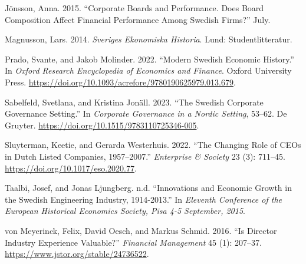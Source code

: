 \documentclass[
]{article}
\newlength{\cslhangindent}
\newenvironment{CSLReferences}[2] %
 {\begin{list}{}{%
  \setlength{\itemindent}{0pt}
  \setlength{\leftmargin}{0pt}
  \setlength{\parsep}{0pt}
  \ifodd #1
   \setlength{\leftmargin}{\cslhangindent}
   \setlength{\itemindent}{-1\cslhangindent}
  \fi
  \setlength{\itemsep}{#2\baselineskip}}}
 {\end{list}}
\begin{document}
\begin{CSLReferences}{1}{0}
Jönsson, Anna. 2015. {``Corporate {Boards} and {Performance}. {Does}
Board Composition Affect Financial Performance Among {Swedish} Firms?''}
July.

Magnusson, Lars. 2014. \emph{Sveriges Ekonomiska Historia}. Lund:
Studentlitteratur.

Prado, Svante, and Jakob Molinder. 2022. {``Modern {Swedish Economic
History}.''} In \emph{Oxford {Research Encyclopedia} of {Economics} and
{Finance}}. Oxford University Press.
\url{https://doi.org/10.1093/acrefore/9780190625979.013.679}.

Sabelfeld, Svetlana, and Kristina Jonäll. 2023. {``The {Swedish}
Corporate Governance Setting.''} In \emph{Corporate {Governance} in a
{Nordic Setting}}, 53--62. De Gruyter.
\url{https://doi.org/10.1515/9783110725346-005}.

Sluyterman, Keetie, and Gerarda Westerhuis. 2022. {``The {Changing Role}
of {CEOs} in {Dutch Listed Companies}, 1957--2007.''} \emph{Enterprise
\& Society} 23 (3): 711--45. \url{https://doi.org/10.1017/eso.2020.77}.

Taalbi, Josef, and Jonas Ljungberg. n.d. {``Innovations and {Economic
Growth} in the {Swedish Engineering Industry}, 1914-2013.''} In
\emph{Eleventh {Conference} of the {European Historical Economics
Society}, {Pisa} 4-5 {September}, 2015}.

von Meyerinck, Felix, David Oesch, and Markus Schmid. 2016. {``Is
{Director Industry Experience Valuable}?''} \emph{Financial Management}
45 (1): 207--37. \url{https://www.jstor.org/stable/24736522}.

\end{CSLReferences}
\end{document}
